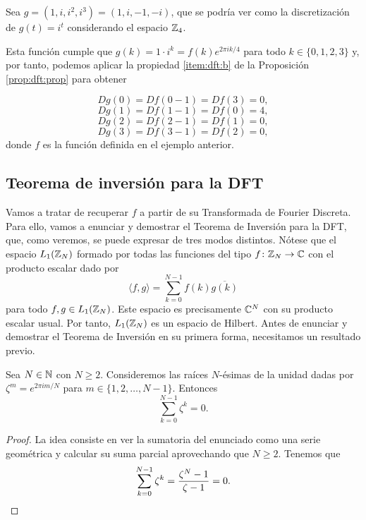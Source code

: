 \documentclass{article}
\begin{document}
\begin{ex} \label{ex:g_muchas_is}
Sea $g=(1,i,i^2,i^3)=(1,i,-1,-i)$, que se podría ver como la discretización de $g(t)=i^t$ considerando el espacio $\mathbb{Z}_4$.

Esta función cumple que $g(k)=1\cdot i^{k}=f(k)e^{2\pi ik/4}$ para todo $k\in\{0,1,2,3\}$ y, por tanto, podemos aplicar la propiedad \ref{item:dft:b} de la Proposición \ref{prop:dft:prop} para obtener

\[
Dg(0)=Df(0-1)=Df(3)=0,
\]
\[
Dg(1)=Df(1-1)=Df(0)=4,
\]
\[
Dg(2)=Df(2-1)=Df(1)=0,
\]
\[
Dg(3)=Df(3-1)=Df(2)=0,
\]
donde $f$ es la función definida en el ejemplo anterior.
\end{ex}

\subsection{Teorema de inversión para la DFT}

Vamos a tratar de recuperar $f$ a partir de su Transformada de Fourier Discreta. Para ello, vamos a enunciar y demostrar el Teorema de Inversión para la DFT, que, como veremos, se puede expresar de tres modos distintos. 
Nótese que el espacio $L_1(\mathbb{Z}_N)$ formado por todas las funciones del tipo $f\colon\mathbb{Z}_N \rightarrow \mathbb{C}$ con el producto escalar dado por
\[
    \langle f,g \rangle = \sum_{k=0}^{N-1}f(k)\overline{g(k)}
\]
para todo $f,g \in L_1(\mathbb{Z} _N)$. Este espacio es precisamente $\mathbb{C}^N$ con su producto escalar usual. Por tanto, $L_1(\mathbb{Z}_N)$ es un espacio de Hilbert.
Antes de enunciar y demostrar el Teorema de Inversión en su primera forma, necesitamos un resultado previo.
\begin{lemma} \label{lem:sumroots}
    Sea $N \in \mathbb{N}$ con $N\ge 2$. Consideremos las raíces $N$-ésimas de la unidad dadas por $\zeta^m = e^{2\pi im / N}$ para $m \in \{1,2, \dots , N-1\}$. Entonces
    \begin{equation*}
        \sum_{k=0}^{N-1}\zeta ^k = 0.
    \end{equation*}
\end{lemma}
\begin{proof}
    La idea consiste en ver la sumatoria del enunciado como una serie geométrica y calcular su suma parcial aprovechando que $N\ge 2$. Tenemos que
    \[
        \sum_{k=0}^{N-1}\zeta ^k = \frac{\zeta^N - 1}{\zeta - 1} = 0. \qedhere
    \]
\end{proof}
\end{document}
